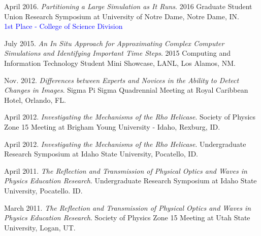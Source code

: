 \begin{etaremune}[topsep=0pt, itemsep=3pt, partopsep=0pt, parsep=0pt]
    \item April 2016. \textit{Partitioning a Large Simulation as It Runs}. 2016 Graduate Student Union Research Symposium at University of Notre Dame, Notre Dame, IN.\\
    \textcolor{blue}{1st Place - College of Science Division}
    
    \item July 2015. \textit{An In Situ Approach for Approximating Complex Computer Simulations and Identifying Important Time Steps}. 2015 Computing and Information Technology Student Mini Showcase, LANL, Los Alamos, NM.
    
    \item Nov. 2012. \textit{Differences between Experts and Novices in the Ability to Detect Changes in Images}. Sigma Pi Sigma Quadrennial Meeting at Royal Caribbean Hotel, Orlando, FL.
    
    \item April 2012. \textit{Investigating the Mechanisms of the Rho Helicase}. Society of Physics Zone 15 Meeting at Brigham Young University - Idaho, Rexburg, ID.
    
    \item April 2012. \textit{Investigating the Mechanisms of the Rho Helicase}. Undergraduate Research Symposium at Idaho State University, Pocatello, ID.
    
    \item April 2011. \textit{The Reflection and Transmission of Physical Optics and Waves in Physics Education Research}. Undergraduate Research Symposium at Idaho State University, Pocatello. ID.
    
    \item March 2011. \textit{The Reflection and Transmission of Physical Optics and Waves in Physics Education Research}. Society of Physics Zone 15 Meeting at Utah State University, Logan, UT.
\end{etaremune}